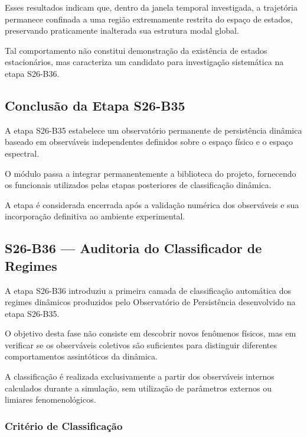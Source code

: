 \documentclass[11pt,a4paper]{article}
\begin{document}
Esses resultados indicam que, dentro da janela temporal investigada,
a trajetória permanece confinada a uma região extremamente restrita do
espaço de estados, preservando praticamente inalterada sua estrutura
modal global.

Tal comportamento não constitui demonstração da existência de estados
estacionários, mas caracteriza um candidato para investigação
sistemática na etapa S26-B36.


\subsection{Conclusão da Etapa S26-B35}

A etapa S26-B35 estabelece um observatório permanente de persistência
dinâmica baseado em observáveis independentes definidos sobre o espaço
físico e o espaço espectral.

O módulo passa a integrar permanentemente a biblioteca do projeto,
fornecendo os funcionais utilizados pelas etapas posteriores de
classificação dinâmica.

A etapa é considerada encerrada após a validação numérica dos
observáveis e sua incorporação definitiva ao ambiente experimental.

\subsection{S26-B36 — Auditoria do Classificador de Regimes}

A etapa S26-B36 introduziu a primeira camada de classificação
automática dos regimes dinâmicos produzidos pelo Observatório de
Persistência desenvolvido na etapa S26-B35.

O objetivo desta fase não consiste em descobrir novos fenômenos
físicos, mas em verificar se os observáveis coletivos são suficientes
para distinguir diferentes comportamentos assintóticos da dinâmica.

A classificação é realizada exclusivamente a partir dos observáveis
internos calculados durante a simulação, sem utilização de parâmetros
externos ou limiares fenomenológicos.


\subsubsection{Critério de Classificação}
\end{document}

